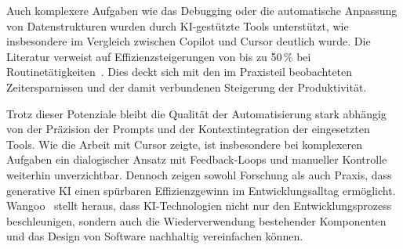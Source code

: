 Auch komplexere Aufgaben wie das Debugging oder die automatische Anpassung von
Datenstrukturen wurden durch KI-gestützte Tools unterstützt, wie insbesondere
im Vergleich zwischen Copilot und Cursor deutlich wurde. Die Literatur verweist
auf Effizienzsteigerungen von bis zu 50\,\% bei
Routinetätigkeiten~\cite{s_future_2024}. Dies deckt sich mit den im Praxisteil
beobachteten Zeitersparnissen und der damit verbundenen Steigerung der
Produktivität.

Trotz dieser Potenziale bleibt die Qualität der Automatisierung stark abhängig
von der Präzision der Prompts und der Kontextintegration der eingesetzten
Tools. Wie die Arbeit mit Cursor zeigte, ist insbesondere bei komplexeren
Aufgaben ein dialogischer Ansatz mit Feedback-Loops und manueller Kontrolle
weiterhin unverzichtbar. Dennoch zeigen sowohl Forschung als auch Praxis, dass
generative KI einen spürbaren Effizienzgewinn im Entwicklungsalltag ermöglicht.
Wangoo~\cite{wangoo_artificial_2018} stellt heraus, dass KI-Technologien nicht
nur den Entwicklungsprozess beschleunigen, sondern auch die Wiederverwendung
bestehender Komponenten und das Design von Software nachhaltig vereinfachen
können.

